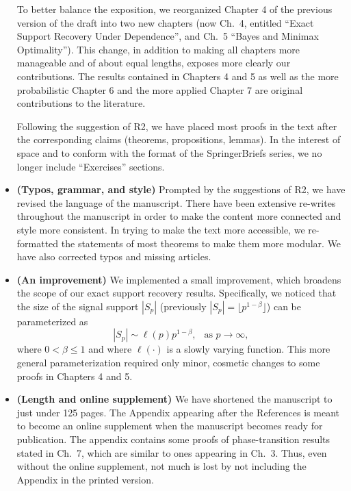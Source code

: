 \documentclass[11pt]{article}
\begin{document}
\begin{itemize}
  To better balance the exposition, we reorganized Chapter 4 of the previous version of the draft into two new chapters (now Ch.\ 4, entitled ``Exact Support Recovery Under Dependence'',  and Ch.\ 5 ``Bayes and Minimax Optimality''). 
  This change, in addition to making all chapters more manageable and of about equal lengths, exposes more clearly our contributions. 
  The results contained in Chapters 4 and 5 as well as the more probabilistic Chapter 6 and the more applied Chapter 7 are original contributions to the literature.
  
  Following the suggestion of R2,  we have placed most proofs in the text after the corresponding claims (theorems, propositions, lemmas).  In the interest of space and to conform with the format of the SpringerBriefs series, we no longer include ``Exercises'' sections. 
  
  \item {\bf (Typos, grammar, and style)}  Prompted by the suggestions of R2, we have revised the language of the manuscript. 
  There have been extensive re-writes throughout the manuscript in order to make the content more connected and style more consistent.  
  In trying to make the text more accessible, we re-formatted the statements of most theorems to make them more modular. 
  We have also corrected typos and missing articles.   
   
   \item {\bf (An improvement)} We implemented a small improvement, which broadens the scope of our exact support recovery results.  Specifically, we noticed that 
   the size of the signal support $|S_p|$  (previously $|S_p| = \lfloor p^{1-\beta}\rfloor$) can be parameterized as
   $$
   |S_p| \sim \ell(p)p^{1-\beta},\ \ \mbox{ as }p\to\infty, 
   $$
   where $0<\beta\le 1$ and where $\ell(\cdot)$ is a slowly varying function.  This more general parameterization required only minor, cosmetic changes to some
   proofs in Chapters 4 and 5.

 \item {\bf (Length and online supplement)} We have shortened the manuscript to just under 125 pages. The Appendix appearing after the 
 References is meant to become an online supplement when the manuscript becomes ready for publication.  The appendix contains some proofs of phase-transition results stated in Ch.\ 7, which are similar to ones appearing in Ch.\ 3.%
 Thus, even without the online supplement, not much is lost by not including the Appendix in the printed version. 

  
 \end{itemize}
 
\end{document}
